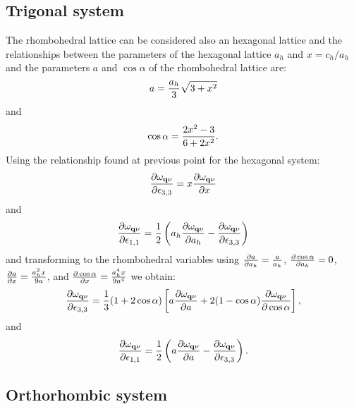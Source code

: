 \documentclass[12pt,a4paper,twoside]{report}
\begin{document}
{\color{web-blue}\subsection{Trigonal system}}
\color{black}

The rhombohedral lattice can be considered also an hexagonal lattice and 
the relationships between the parameters of the hexagonal lattice
$a_h$ and $x=c_h/a_h$ and the parameters $a$ and $\cos \alpha$ of the
rhombohedral lattice are:
\begin{equation}
a={a_h \over 3} \sqrt{3 + x^2}
\end{equation}
and
\begin{equation}
\cos\alpha={ 2 x^2 - 3 \over 6 + 2 x^2}.
\end{equation}
Using the relationship found at previous point for the hexagonal system:
\begin{equation}
{\partial \omega_{{\bf q}\nu} 
\over \partial \epsilon_{3,3}} = x {\partial \omega_{{\bf q}\nu} 
\over \partial x}
\end{equation}
and
\begin{equation}
{\partial \omega_{{\bf q}\nu} 
\over \partial \epsilon_{1,1}} = 
{1\over 2} \left(a_h {\partial \omega_{{\bf q}\nu} \over \partial a_h} - 
{\partial \omega_{{\bf q}\nu} \over \partial 
\epsilon_{3,3}} \right)
\end{equation}
and transforming to the rhombohedral variables using ${\partial a \over \partial
a_h}={a\over a_h}$, ${\partial \cos \alpha \over \partial
a_h}=0$, ${\partial a \over \partial x}={a_h^2 x \over 9 a}$, and
${\partial \cos \alpha \over \partial
x}={ a_h^4 x \over 9 a^4}$ we obtain:
\begin{equation}
{\partial \omega_{{\bf q}\nu} 
\over \partial \epsilon_{3,3}} = {1\over 3} (1 + 2 \cos \alpha)
\left[ a {\partial \omega_{{\bf q}\nu} \over \partial a} +
2 (1-\cos\alpha) {\partial \omega_{{\bf q}\nu} \over \partial \cos \alpha}
\right],
\end{equation}
and
\begin{equation}
{\partial \omega_{{\bf q}\nu} \over \partial \epsilon_{1,1}} = 
{1\over 2} \left(a {\partial \omega_{{\bf q}\nu} \over \partial a} - {\partial 
\omega_{{\bf q}\nu} \over \partial 
\epsilon_{3,3}} \right).
\end{equation}

{\color{web-blue}\subsection{Orthorhombic system}}
\color{black}
\end{document}
